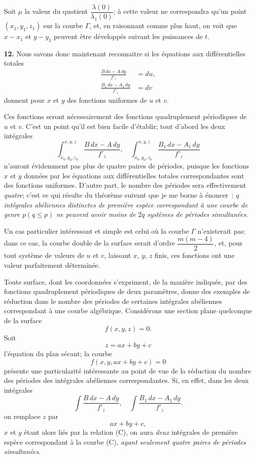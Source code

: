 \documentclass{article}
\begin{document}
Soit $\mu$ la valeur du quotient $\dfrac{\lambda(0)}{\lambda_{1}(0)}$; à cette valeur ne correspondra
qu'un point $(x_{1}, y_{1}, z_{1})$ sur la courbe $\Gamma$, et, en raisonnant comme plus haut, on voit que $x - x_{1}$ et $y - y_{1}$ peuvent être développés suivant les puissances de $t$.

\textbf{12.} Nous savons donc maintenant reconnaitre si les équations aux différentielles totales
\[
\begin{aligned}
\frac{B\,dx - A\,dy}{f'_{z}} &= du, \\
\frac{B_{1}\,dx - A_{1}\,dy}{f'_{z}} &= dv
\end{aligned}
\]
donnent pour $x$ et $y$ des fonctions uniformes de $u$ et $v$.

Ces fonctions seront nécessairement des fonctions quadruplement périodiques de $u$ et $v$. C'est un point qu'il est bien facile d'établir; tout d'abord les deux intégrales
\[
\int_{x_{0}, y_{0}, z_{0}}^{x, y, z} \frac{B\,dx - A\,dy}{f'_{z}}, \quad \int_{x_{0}, y_{0}, z_{0}}^{x, y, z} \frac{B_{1}\,dx - A_{1}\,dy}{f'_{z}}
\]
n'auront évidemment pas plus de quatre paires de périodes, puisque les fonctions $x$ et $y$ données par les équations aux différentielles totales correspondantes sont des fonctions uniformes. D'autre part, le nombre des périodes sera effectivement \emph{quatre}; c'est ce qui résulte du théorème suivant que je me borne à énoncer~: \emph{$q$ intégrales abéliennes distinctes de première espèce correspondant à une courbe de genre $p (q \leq p)$ ne peuvent avoir moins de $2q$ systèmes de périodes simultanées.}

Un cas particulier intéressant et simple est celui où la courbe $\Gamma$ n'existerait pas; dans ce cas, la courbe double de la surface serait d'ordre $\dfrac{m(m - 4)}{2}$, et, pour tout système de valeurs de $u$ et $v$, laissant $x$, $y$, $z$ finis, ces fonctions ont une valeur parfaitement déterminée.

Toute surface, dont les coordonnées s'expriment, de la manière indiquée, par des fonctions quadruplement périodiques de deux paramètres, donne des exemples de réduction dans le nombre des périodes de certaines intégrales abéliennes correspondant à une courbe algébrique. Considérons une section plane quelconque de la surface
\[
f(x, y, z) = 0.
\]
Soit
\[
z = ax + by + c
\]
l'équation du plan sécant; la courbe
\[
f(x, y, ax + by + c) = 0 \tag{C}
\]
présente une particularité intéressante au point de vue de la réduction du nombre des périodes des intégrales abéliennes correspondantes. Si, en effet, dans les deux intégrales
\[
\int \frac{B\,dx - A\,dy}{f'_{z}}, \quad \int \frac{B_{1}\,dx - A_{1}\,dy}{f'_{z}}.
\]
on remplace $z$ par
\[
ax + by + c,
\]
$x$ et $y$ étant alors liés par la relation (C), on aura \emph{deux} intégrales de première espèce correspondant à la courbe (C), \emph{ayant seulement quatre paires de périodes simultanées.}
\end{document}
